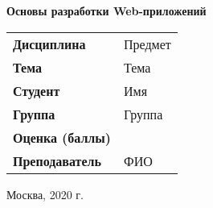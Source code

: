 \begin{center}
    \textbf{Основы разработки Web-приложений} \\
    \vspace{0.5cm}
\end{center}

\vspace{4cm}

\begin{flushleft}
    \begin{tabular}{ll}
        \textbf{Дисциплина} & Предмет \\
        \textbf{Тема} & Тема\\
        \textbf{Студент} & Имя \\
        \textbf{Группа} & Группа \\
        \textbf{Оценка (баллы)} & \\
        \textbf{Преподаватель} & ФИО \\
    \end{tabular}
\end{flushleft}

\vspace{4cm}

\begin{center}
    Москва, 2020 г.
\end{center}
